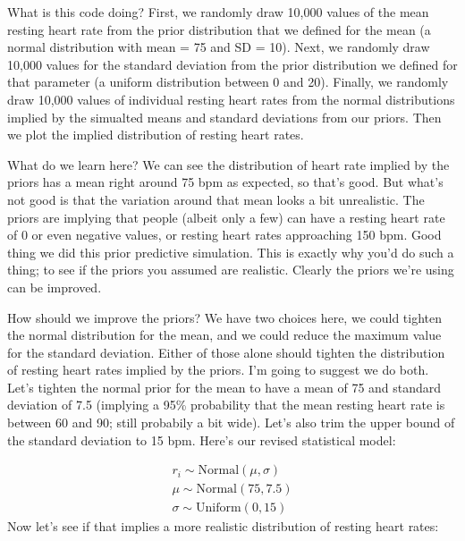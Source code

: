 \documentclass[
]{book}
\begin{document}
What is this code doing? First, we randomly draw 10,000 values of the mean resting heart rate from the prior distribution that we defined for the mean (a normal distribution with mean = 75 and SD = 10). Next, we randomly draw 10,000 values for the standard deviation from the prior distribution we defined for that parameter (a uniform distribution between 0 and 20). Finally, we randomly draw 10,000 values of individual resting heart rates from the normal distributions implied by the simualted means and standard deviations from our priors. Then we plot the implied distribution of resting heart rates.

What do we learn here? We can see the distribution of heart rate implied by the priors has a mean right around 75 bpm as expected, so that's good. But what's not good is that the variation around that mean looks a bit unrealistic. The priors are implying that people (albeit only a few) can have a resting heart rate of 0 or even negative values, or resting heart rates approaching 150 bpm. Good thing we did this prior predictive simulation. This is exactly why you'd do such a thing; to see if the priors you assumed are realistic. Clearly the priors we're using can be improved.

How should we improve the priors? We have two choices here, we could tighten the normal distribution for the mean, and we could reduce the maximum value for the standard deviation. Either of those alone should tighten the distribution of resting heart rates implied by the priors. I'm going to suggest we do both. Let's tighten the normal prior for the mean to have a mean of 75 and standard deviation of 7.5 (implying a 95\% probability that the mean resting heart rate is between 60 and 90; still probabily a bit wide). Let's also trim the upper bound of the standard deviation to 15 bpm. Here's our revised statistical model:

\[
\begin{array}{l}
r_i \sim \mathrm{Normal}(\mu, \sigma) \\
\mu \sim \mathrm{Normal}(75, 7.5) \\
\sigma \sim \mathrm{Uniform}(0, 15)
\end{array}
\]
Now let's see if that implies a more realistic distribution of resting heart rates:
\end{document}
